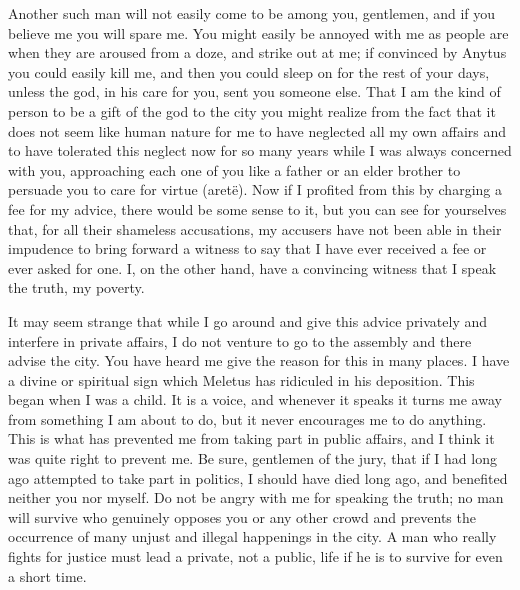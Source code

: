 Another such man will not easily come to be among you, gentlemen, and if you believe me you
will spare me. You might easily be annoyed with me as people are when they are aroused from a
doze, and strike out at me; if convinced by Anytus you could easily kill me, and then you could
sleep on for the rest of your days, unless the god, in his care for you, sent you someone else. That
I am the kind of person to be a gift of the god to the city you might realize from the fact that it does
not seem like human nature for me to have neglected all my own affairs and to have tolerated this
neglect now for so many years while I was always concerned with you, approaching each one of
you like a father or an elder brother to persuade you to care for virtue (aretë). Now if I profited
from this by charging a fee for my advice, there would be some sense to it, but you can see for
yourselves that, for all their shameless accusations, my accusers have not been able in their
impudence to bring forward a witness to say that I have ever received a fee or ever asked for one.
I, on the other hand, have a convincing witness that I speak the truth, my poverty.

It may seem strange that while I go around and give this advice privately and interfere in
private affairs, I do not venture to go to the assembly and there advise the city. You have heard me
give the reason for this in many places. I have a divine or spiritual sign which Meletus has
ridiculed in his deposition. This began when I was a child. It is a voice, and whenever it speaks it
turns me away from something I am about to do, but it never encourages me to do anything. This
is what has prevented me from taking part in public affairs, and I think it was quite right to prevent
me. Be sure, gentlemen of the jury, that if I had long ago attempted to take part in politics, I should
have died long ago, and benefited neither you nor myself. Do not be angry with me for speaking
the truth; no man will survive who genuinely opposes you or any other crowd and prevents the
occurrence of many unjust and illegal happenings in the city. A man who really fights for justice
must lead a private, not a public, life if he is to survive for even a short time.

